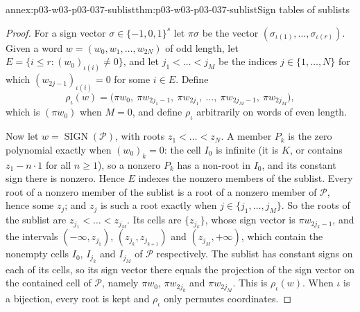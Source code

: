 \begin{annexitem}{annex:p03-w03-p03-037-sublist}{thm:p03-w03-p03-037-sublist}{Sign tables of sublists}
\begin{proof}
For a sign vector \(\sigma\in\{-1,0,1\}^s\) let \(\pi\sigma\) be the vector
\((\sigma_{\iota(1)},\dots,\sigma_{\iota(r)})\).  Given a word
\(w=(w_0,w_1,\dots,w_{2N})\) of odd length, let
\(E=\{i\leq r:(w_0)_{\iota(i)}\neq0\}\), and let \(j_1<\dots<j_M\) be the
indices \(j\in\{1,\dots,N\}\) for which \((w_{2j-1})_{\iota(i)}=0\) for some
\(i\in E\).  Define
\[
\rho_\iota(w)=\bigl(\pi w_0,\ \pi w_{2j_1-1},\ \pi w_{2j_1},\ \dots,\
\pi w_{2j_M-1},\ \pi w_{2j_M}\bigr),
\]
which is \((\pi w_0)\) when \(M=0\), and define \(\rho_\iota\) arbitrarily on
words of even length.

Now let \(w=\operatorname{SIGN}(\mathcal P)\), with roots
\(z_1<\dots<z_N\).  A member \(P_k\) is the zero polynomial exactly when
\((w_0)_k=0\): the cell \(I_0\) is infinite (it is \(K\), or contains
\(z_1-n\cdot1\) for all \(n\geq1\)), so a nonzero \(P_k\) has a non-root in
\(I_0\), and its constant sign there is nonzero.  Hence \(E\) indexes the
nonzero members of the sublist.  Every root of a nonzero member of the
sublist is a root of a nonzero member of \(\mathcal P\), hence some
\(z_j\); and \(z_j\) is such a root exactly when \(j\in\{j_1,\dots,j_M\}\).
So the roots of the sublist are \(z_{j_1}<\dots<z_{j_M}\).  Its cells are
\(\{z_{j_k}\}\), whose sign vector is \(\pi w_{2j_k-1}\), and the intervals
\((-\infty,z_{j_1})\), \((z_{j_k},z_{j_{k+1}})\) and
\((z_{j_M},+\infty)\), which contain the nonempty cells \(I_0\),
\(I_{j_k}\) and \(I_{j_M}\) of \(\mathcal P\) respectively.  The sublist has
constant signs on each of its cells, so its sign vector there equals the
projection of the sign vector on the contained cell of \(\mathcal P\), namely
\(\pi w_0\), \(\pi w_{2j_k}\) and \(\pi w_{2j_M}\).  This is
\(\rho_\iota(w)\).  When \(\iota\) is a bijection, every root is kept and
\(\rho_\iota\) only permutes coordinates.
\end{proof}
\end{annexitem}

